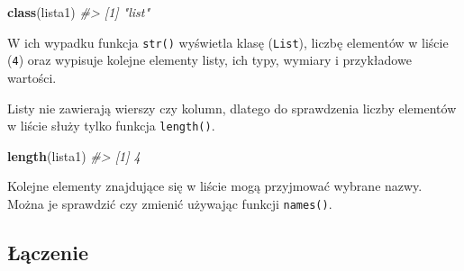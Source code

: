 \documentclass[paper=6in:9in,pagesize=pdftex,headinclude=on,footinclude=on,10pt]{scrbook}
\newenvironment{Shaded}{\begin{snugshade}}{\end{snugshade}}
\newcommand{\CommentTok}[1]{\textcolor[rgb]{0.56,0.35,0.01}{\textit{#1}}}
\newcommand{\KeywordTok}[1]{\textcolor[rgb]{0.13,0.29,0.53}{\textbf{#1}}}
\newcommand{\NormalTok}[1]{#1}
\newcommand{\StringTok}[1]{\textcolor[rgb]{0.31,0.60,0.02}{#1}}
\begin{document}
\begin{Shaded}
\begin{Highlighting}[]
\KeywordTok{class}\NormalTok{(lista1)}
\CommentTok{#> [1] "list"}
\end{Highlighting}
\end{Shaded}

W ich wypadku funkcja \texttt{str()} wyświetla klasę (\texttt{List}), liczbę elementów w liście (\texttt{4}) oraz wypisuje kolejne elementy listy, ich typy, wymiary i przykładowe wartości.

\begin{Shaded}
\end{Shaded}

Listy nie zawierają wierszy czy kolumn, dlatego do sprawdzenia liczby elementów w liście służy tylko funkcja \texttt{length()}.

\begin{Shaded}
\begin{Highlighting}[]
\KeywordTok{length}\NormalTok{(lista1)}
\CommentTok{#> [1] 4}
\end{Highlighting}
\end{Shaded}

Kolejne elementy znajdujące się w liście mogą przyjmować wybrane nazwy.
Można je sprawdzić czy zmienić używając funkcji \texttt{names()}.

\begin{Shaded}
\end{Shaded}

\hypertarget{ux142ux105czenie-2}{%
\subsection{Łączenie}\label{ux142ux105czenie-2}}
\end{document}
